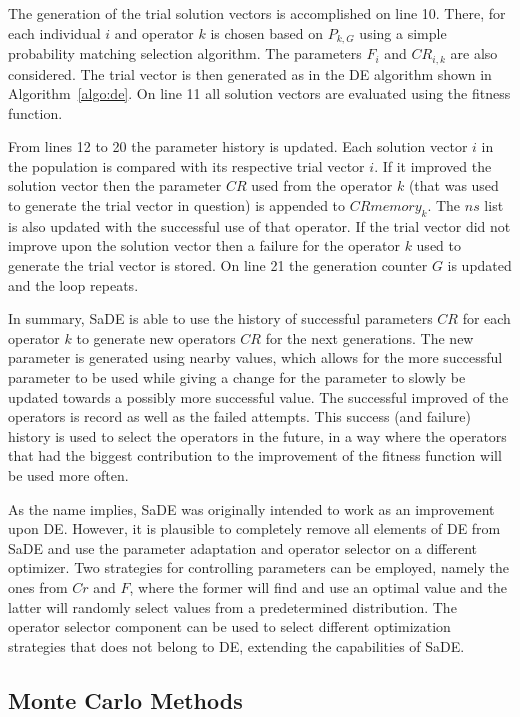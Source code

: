 The generation of the trial solution vectors is accomplished on line 10. There,
for each individual $i$ and operator $k$ is chosen based on $P_{k,G}$ using a
simple probability matching selection algorithm. The parameters
$F_i$ and $CR_{i,k}$ are also considered. The trial vector is then
generated as in the \ac{DE} algorithm shown in Algorithm~\ref{algo:de}. On line
11 all solution vectors are evaluated using the fitness function.

From lines 12 to 20 the parameter history is updated. Each
solution vector $i$ in the population is compared with its
respective trial vector $i$. If it improved the solution vector
then the parameter $CR$ used from the operator $k$
(that was used to generate the trial vector in question) is appended
to $CRmemory_k$. The $ns$ list is also updated with the successful use of
that operator. If the trial vector did not improve upon the solution vector
then a failure for the operator $k$ used to generate the trial vector is stored.
On line 21 the generation counter $G$ is updated and the loop repeats.

In summary, \ac{SaDE} is able to use the history of successful parameters $CR$
for each operator $k$ to generate new operators $CR$ for the next generations.
The new parameter is generated using nearby values, which allows for the
more successful parameter to be used while giving a change for the
parameter to slowly be updated towards a possibly more successful value.
The successful improved of the operators is record as well as the failed
attempts. This success (and failure) history is used to select the operators
in the future, in a way where the operators that had the biggest
contribution to the improvement of the fitness function will be used more often.

As the name implies, \ac{SaDE} was originally intended to work as an improvement upon
\ac{DE}. However, it is plausible to completely remove all elements of \ac{DE} from
\ac{SaDE} and use the parameter adaptation and operator selector on a different
optimizer. Two strategies for controlling parameters can be employed, namely the
ones from $Cr$ and $F$, where the former will find and use an optimal value and
the latter will randomly select values from a predetermined distribution. The
operator selector component can be used to select different optimization strategies
that does not belong to \ac{DE}, extending the capabilities of \ac{SaDE}.

\subsection{Monte Carlo Methods} \label{sec:monte-carlo-methods}

